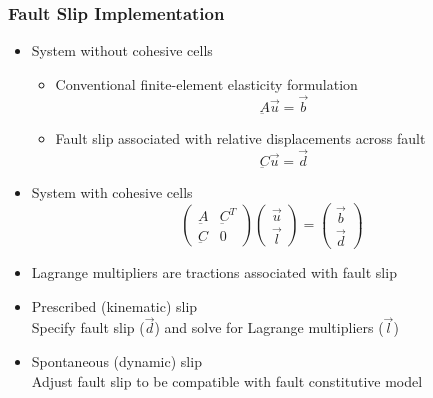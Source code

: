 \documentclass{beamer}
\begin{document}
\begin{frame}
  \frametitle{Fault Slip Implementation}

  \begin{itemize}
  \item System without cohesive cells
    \begin{itemize}
    \item Conventional finite-element elasticity formulation
      \begin{equation}
        \underbar{A} \vec{u} = \vec{b} \nonumber
      \end{equation}
    \item Fault slip associated with relative displacements across fault
      \begin{equation}
        \underbar{C} \vec{u} = \vec{d} \nonumber
      \end{equation}
    \end{itemize}
  \item System with cohesive cells
    \begin{equation}
      \left( \begin{array}{cc}
          \underbar{A} & \underbar{C}^T\\
          \underbar{C} & 0
        \end{array} \right)
      \left( \begin{array}{c}
          \vec{u}\\
          \vec{l}
        \end{array}\right)
      =
      \left( \begin{array}{c}
          \vec{b}\\
          \vec{d}
        \end{array} \right)
      \nonumber
    \end{equation}
  \item Lagrange multipliers are tractions associated with fault slip
  \item Prescribed (kinematic) slip\\
    Specify fault slip ($\vec{d}$) and solve for Lagrange multipliers ($\vec{l}$)
  \item Spontaneous (dynamic) slip\\
    Adjust fault slip to be compatible with fault constitutive model
\end{itemize}
  
\end{frame}
\end{document}
